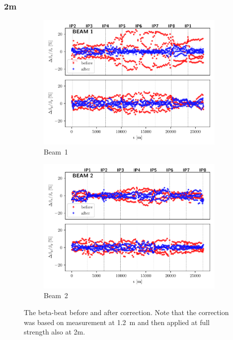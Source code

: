 \documentclass{cernatsnote}
\begin{document}
\subsubsection{2m}
\begin{figure}[ht]
\begin{subfigure}{.5\textwidth}
  \centering
  \includegraphics[width=.98\linewidth]{2023/2m/beta_plot_200cm_BEAM_1.pdf}  
  \caption{Beam~1}
\end{subfigure}
\begin{subfigure}{.5\textwidth}
  \centering
  \includegraphics[width=.98\linewidth]{2023/2m/beta_plot_200cm_BEAM_2.pdf}  
  \caption{Beam~2}
\end{subfigure}
\caption{The beta-beat before and after correction. Note that the correction was based on measurement at 1.2~m and then applied at full strength also at 2m. }
\label{fig:2m_before_after_correction}
\end{figure}
\end{document}
